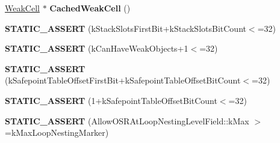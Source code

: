 \begin{DoxyCompactItemize}
\item 
\hyperlink{classv8_1_1internal_1_1_weak_cell}{Weak\+Cell} $\ast$ {\bfseries Cached\+Weak\+Cell} ()\hypertarget{classv8_1_1internal_1_1_code_a9c5a38b9d9bf30cf50d937245a28b7af}{}\label{classv8_1_1internal_1_1_code_a9c5a38b9d9bf30cf50d937245a28b7af}

\item 
{\bfseries S\+T\+A\+T\+I\+C\+\_\+\+A\+S\+S\+E\+RT} (k\+Stack\+Slots\+First\+Bit+k\+Stack\+Slots\+Bit\+Count$<$=32)\hypertarget{classv8_1_1internal_1_1_code_a4c802c523021aa6d359193d1cdcce0fe}{}\label{classv8_1_1internal_1_1_code_a4c802c523021aa6d359193d1cdcce0fe}

\item 
{\bfseries S\+T\+A\+T\+I\+C\+\_\+\+A\+S\+S\+E\+RT} (k\+Can\+Have\+Weak\+Objects+1$<$=32)\hypertarget{classv8_1_1internal_1_1_code_a7b0285e57e9330ed230a3ef9dc034683}{}\label{classv8_1_1internal_1_1_code_a7b0285e57e9330ed230a3ef9dc034683}

\item 
{\bfseries S\+T\+A\+T\+I\+C\+\_\+\+A\+S\+S\+E\+RT} (k\+Safepoint\+Table\+Offset\+First\+Bit+k\+Safepoint\+Table\+Offset\+Bit\+Count$<$=32)\hypertarget{classv8_1_1internal_1_1_code_a8d3c51b70402e4c101c632bacab6e9b9}{}\label{classv8_1_1internal_1_1_code_a8d3c51b70402e4c101c632bacab6e9b9}

\item 
{\bfseries S\+T\+A\+T\+I\+C\+\_\+\+A\+S\+S\+E\+RT} (1+k\+Safepoint\+Table\+Offset\+Bit\+Count$<$=32)\hypertarget{classv8_1_1internal_1_1_code_acd3578a6cab988b1caf816a5eb77a70d}{}\label{classv8_1_1internal_1_1_code_acd3578a6cab988b1caf816a5eb77a70d}

\item 
{\bfseries S\+T\+A\+T\+I\+C\+\_\+\+A\+S\+S\+E\+RT} (Allow\+O\+S\+R\+At\+Loop\+Nesting\+Level\+Field\+::k\+Max $>$=k\+Max\+Loop\+Nesting\+Marker)\hypertarget{classv8_1_1internal_1_1_code_afcc714273822ccf8e1fcf759c7b03298}{}\label{classv8_1_1internal_1_1_code_afcc714273822ccf8e1fcf759c7b03298}

\end{DoxyCompactItemize}
